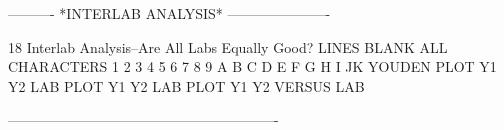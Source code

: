  
 
 
 
 
 
 
 
 
 
 
 
 
 
 
 
 
 
 
 
 
 
 
 
 
 
 
 
 
 
 
----------  *INTERLAB ANALYSIS*  ----------------------
 
18
Interlab Analysis--Are All Labs Equally Good?
      LINES BLANK ALL
      CHARACTERS 1 2 3 4 5 6 7 8 9 A B C D E F G H I JK
      YOUDEN PLOT Y1 Y2 LAB
      PLOT Y1 Y2 LAB
      PLOT Y1 Y2 VERSUS LAB
 
----------------------------------------------------------
 
 
 
 
 
 
 
 
 
 
 
 
 
 
 
 
 
 
 
 
 
 
 
 
 
 
 
 
 
 
 
 
 
 
 
 
 
 
 
 
 
 
 
 
 
 
 
 
 
 
 
 
 
 
 
 
 
 
 
 
 
 
 
 
 
 
 
 
 

